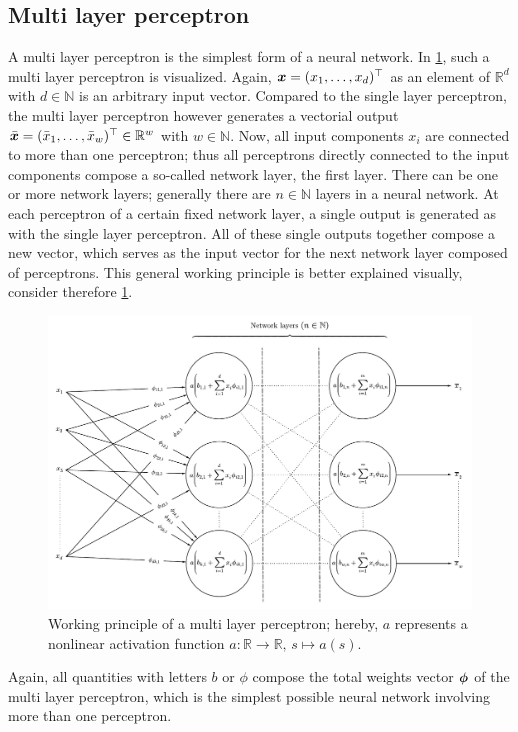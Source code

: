 \documentclass[a4paper,12pt]{report}
\begin{document}
\subsection{Multi layer perceptron}
A multi layer perceptron is the simplest form of a neural network. In \cref{fig:MLP}, such a multi layer perceptron is visualized. Again, $\bm{x} = (x_1, \dots, x_d)^\top$ as an element of $\mathbb{R}^d$ with $d \in \mathbb{N}$ is an arbitrary input vector. Compared to the single layer perceptron, the multi layer perceptron however generates a vectorial output $\bar{\bm{x}} = (\bar{x}_1,\dots,\bar{x}_w)^\top \in \mathbb{R}^w$ with $w \in \mathbb{N}$. Now, all input components $x_i$ are connected to more than one perceptron; thus all perceptrons directly connected to the input components compose a so-called network layer, the first layer. There can be one or more network layers; generally there are $n\in \mathbb{N}$ layers in a neural network. At each perceptron of a certain fixed network layer, a single output is generated as with the single layer perceptron. All of these single outputs together compose a new vector, which serves as the input vector for the next network layer composed of perceptrons. This general working principle is better explained visually, consider therefore \cref{fig:MLP}.
\begin{figure}[h!]
\centering
\includegraphics[width=\textwidth]{figures/MLP.pdf}
\caption{Working principle of a multi layer perceptron; hereby, $a$ represents a nonlinear activation function $a :\mathbb{R}\rightarrow \mathbb{R},\, s\mapsto a(s)$.}
\label{fig:MLP}
\end{figure}
Again, all quantities with letters $b$ or $\phi$ compose the total weights vector $\bm{\phi}$ of the multi layer perceptron, which is the simplest possible neural network involving more than one perceptron.
\end{document}
